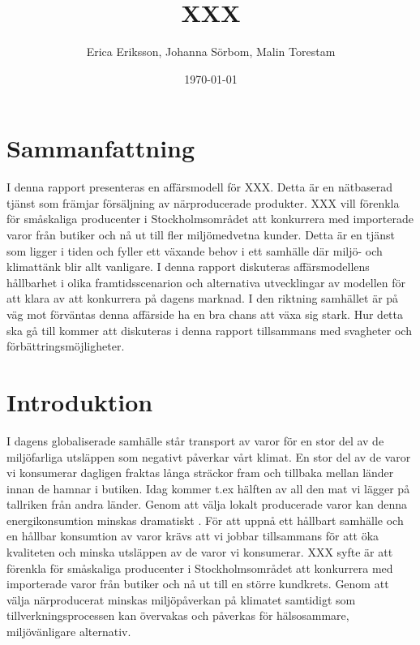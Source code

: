 \documentclass[10pt,a4paper,oneside]{article}
\title{XXX}
\author{Erica Eriksson, Johanna Sörbom, Malin Torestam}
\date{\today}
\begin{document}
\maketitle
\newpage

\section{Sammanfattning}
I denna rapport presenteras en affärsmodell för XXX. Detta är en nätbaserad tjänst som främjar försäljning av närproducerade produkter. XXX vill förenkla för småskaliga producenter i Stockholmsområdet att konkurrera med importerade varor från butiker och nå ut till fler miljömedvetna kunder. Detta är en tjänst som ligger i tiden och fyller ett växande behov i ett samhälle där miljö- och klimattänk blir allt vanligare. I denna rapport diskuteras affärsmodellens hållbarhet i olika framtidsscenarion och alternativa utvecklingar av modellen för att klara av att konkurrera på dagens marknad. I den riktning samhället är på väg mot förväntas denna affärside ha en bra chans att växa sig stark. Hur detta ska gå till kommer att diskuteras i denna rapport tillsammans med svagheter och förbättringsmöjligheter. 
\newpage

\tableofcontents
\newpage

\section{Introduktion}
I dagens globaliserade samhälle står transport av varor för en stor del av de miljöfarliga utsläppen som negativt påverkar vårt klimat. En stor del av de varor vi konsumerar dagligen fraktas långa sträckor fram och tillbaka mellan länder innan de hamnar i butiken. Idag kommer t.ex hälften av all den mat vi lägger på tallriken från andra länder. Genom att välja lokalt producerade varor kan denna energikonsumtion minskas dramatiskt \cite{Naturskyddsföreningen2}. För att uppnå ett hållbart samhälle och en hållbar konsumtion av varor krävs att vi jobbar tillsammans för att öka kvaliteten och minska utsläppen av de varor vi konsumerar. XXX syfte är att förenkla för småskaliga producenter i Stockholmsområdet att konkurrera med importerade varor från butiker och nå ut till en större kundkrets. Genom att välja närproducerat minskas miljöpåverkan på klimatet samtidigt som tillverkningsprocessen kan övervakas och påverkas för hälsosammare, miljövänligare alternativ. 



\newpage
\end{document}
